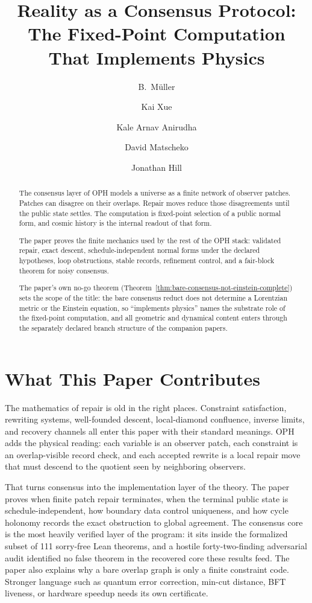 \documentclass[11pt]{article}
\title{Reality as a Consensus Protocol:\\
The Fixed-Point Computation That Implements Physics}
\author{B.\ M\"uller \and Kai Xue \and Kale Arnav Anirudha \and David Matscheko \and Jonathan Hill}
\date{\OPHPaperReleaseDate}
\theoremstyle{remark}
\theoremstyle{plain}
\begin{document}
\maketitle
\OPHPaperReleaseBanner

\begin{abstract}
The consensus layer of OPH models a universe as a finite network of observer patches. Patches can disagree on their overlaps. Repair moves reduce those disagreements until the public state settles. The computation is fixed-point selection of a public normal form, and cosmic history is the internal readout of that form.

The paper proves the finite mechanics used by the rest of the OPH stack:
validated repair, exact descent, schedule-independent normal forms under the
declared hypotheses, loop obstructions, stable records, refinement control, and
a fair-block theorem for noisy consensus.

The paper's own no-go theorem
(Theorem~\ref{thm:bare-consensus-not-einstein-complete}) sets the scope of the
title: the bare consensus reduct does not determine a Lorentzian metric or the
Einstein equation, so ``implements physics'' names the substrate role of the
fixed-point computation, and all geometric and dynamical content enters through
the separately declared branch structure of the companion papers.
\end{abstract}

\section*{What This Paper Contributes}

The mathematics of repair is old in the right places. Constraint satisfaction, rewriting systems,
well-founded descent, local-diamond confluence, inverse limits, and recovery channels all enter this
paper with their standard meanings. OPH adds the physical reading: each variable is an observer
patch, each constraint is an overlap-visible record check, and each accepted rewrite is a local
repair move that must descend to the quotient seen by neighboring observers.

That turns consensus into the implementation layer of the theory. The paper proves when finite
patch repair terminates, when the terminal public state is schedule-independent, how boundary data
control uniqueness, and how cycle holonomy records the exact obstruction to global agreement. The
consensus core is the most heavily verified layer of the program: it sits inside the formalized
subset of 111 sorry-free Lean theorems, and a hostile forty-two-finding adversarial audit
identified no false theorem in the recovered core these results feed. The paper
also explains why a bare overlap graph is only a finite constraint code. Stronger language such as
quantum error correction, min-cut distance, BFT liveness, or hardware speedup needs its own
certificate.
\end{document}

